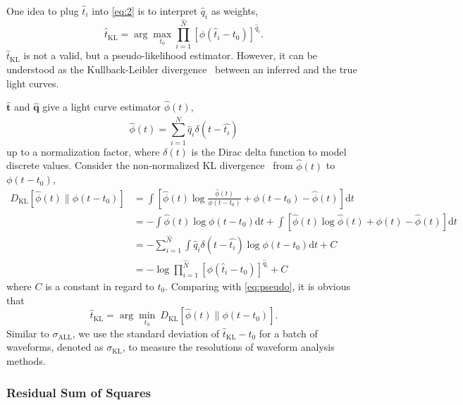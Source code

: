 One idea to plug $\hat{t}_i$ into \eqref{eq:2} is to interpret $\hat{q}_i$ as weights,
\begin{equation}
  \label{eq:pseudo}
  \hat{t}_\mathrm{KL} = \arg\underset{t_0}{\max} \prod_{i=1}^{\hat{N}} \left[\phi(\hat{t}_i-t_0)\right]^{\hat{q}_i}.
\end{equation}
$\hat{t}_\mathrm{KL}$ is not a valid, but a pseudo-likelihood estimator. However, it can be understood as the Kullback-Leibler divergence~\cite{kullback_information_1951} between an inferred and the true light curves.

$\bm{\hat{t}}$ and $\bm{\hat{q}}$ give a light curve estimator $\hat{\phi}(t)$,
\begin{equation}
  \label{eq:lc}
  \hat{\phi}(t) = \sum_{i=1}^{\hat{N}} \hat{q}_i\delta(t-\hat{t_i})
\end{equation}
up to a normalization factor, where $\delta(t)$ is the Dirac delta function to model discrete values.  Consider the non-normalized KL divergence~\cite{mihoko_robust_2002} from $\hat{\phi}(t)$ to $\phi(t-t_{0})$,
\begin{equation}
  \begin{aligned}
    D_\mathrm{KL}\left[\hat{\phi}(t) \parallel \phi(t-t_0)\right] & =\int \left[\hat{\phi}(t) \log\frac{\hat{\phi}(t)}{\phi(t-t_0)} + \phi(t-t_0) - \hat{\phi}(t) \right]\mathrm{d}t \\
    & = - \int \hat{\phi}(t) \log\phi(t-t_0)\mathrm{d}t + \int \left[\hat{\phi}(t) \log\hat{\phi}(t) + \phi(t) - \hat{\phi}(t) \right]\mathrm{d}t \\
    & = - \sum_{i=1}^{\hat{N}}\int \hat{q}_i\delta(t-\hat{t_i}) \log\phi(t-t_0)\mathrm{d}t + C \\
    & = -\log \prod_{i=1}^{\hat{N}} \left[\phi(\hat{t}_i-t_0)\right]^{\hat{q}_i} + C
  \label{eq:kl}
  \end{aligned}
\end{equation}
where $C$ is a constant in regard to $t_0$.  Comparing with \eqref{eq:pseudo}, it is obvious that
\begin{equation}
  \label{eq:kl2}
  \hat{t}_\mathrm{KL} = \arg\underset{t_0}{\min}~D_\mathrm{KL}\left[\hat{\phi}(t) \parallel \phi(t-t_0)\right].
\end{equation}
Similar to $\sigma_\mathrm{ALL}$, we use the standard deviation of $\hat{t}_\mathrm{KL} - t_0$ for a 
batch of waveforms, denoted as $\sigma_\mathrm{KL}$, to measure the resolutions of waveform analysis methods.

\subsubsection{Residual Sum of Squares}
\label{sec:rss}

